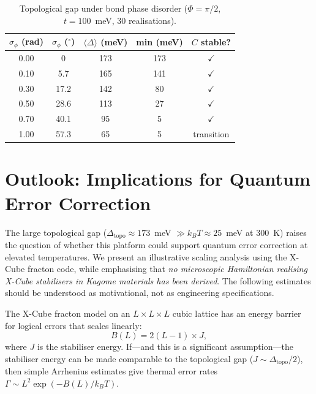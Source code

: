 \documentclass[aps,prb,twocolumn,superscriptaddress,floatfix]{revtex4-2}
\begin{document}
\begin{table}[b]
\caption{Topological gap under bond phase disorder ($\Phi = \pi/2$, $t = 100$~meV, 30 realisations).}
\label{tab:bond_disorder}
\begin{ruledtabular}
\begin{tabular}{ccccc}
$\sigma_\phi$ (rad) & $\sigma_\phi$ ($^\circ$) & $\langle\Delta\rangle$ (meV) & min (meV) & $C$ stable? \\
\hline
0.00 & 0 & 173 & 173 & $\checkmark$ \\
0.10 & 5.7 & 165 & 141 & $\checkmark$ \\
0.30 & 17.2 & 142 & 80 & $\checkmark$ \\
0.50 & 28.6 & 113 & 27 & $\checkmark$ \\
0.70 & 40.1 & 95 & 5 & $\checkmark$ \\
1.00 & 57.3 & 65 & 5 & transition \\
\end{tabular}
\end{ruledtabular}
\end{table}

\section{Outlook: Implications for Quantum Error Correction}
\label{sec:clrc}

The large topological gap ($\Delta_{\mathrm{topo}} \approx 173$~meV $\gg k_BT \approx 25$~meV at 300~K) raises the question of whether this platform could support quantum error correction at elevated temperatures. We present an illustrative scaling analysis using the X-Cube fracton code, while emphasising that \emph{no microscopic Hamiltonian realising X-Cube stabilisers in Kagome materials has been derived}. The following estimates should be understood as motivational, not as engineering specifications.

The X-Cube fracton model on an $L \times L \times L$ cubic lattice has an energy barrier for logical errors that scales linearly:
\begin{equation}
    B(L) = 2(L-1) \times J,
    \label{eq:barrier}
\end{equation}
where $J$ is the stabiliser energy. If---and this is a significant assumption---the stabiliser energy can be made comparable to the topological gap ($J \sim \Delta_{\mathrm{topo}}/2$), then simple Arrhenius estimates give thermal error rates $\Gamma \sim L^2 \exp(-B(L)/k_BT)$.
\end{document}
